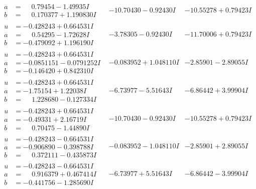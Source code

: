 \documentclass[1p]{elsarticle_modified}
\theoremstyle{definition}
\begin{document}
$$\begin{array}{c|c|c}
\begin{aligned}
a &= \phantom{-}0.79454 - 1.49935 I \\
b &= \phantom{-}0.170377 + 1.190830 I\end{aligned}
 & -10.70430 - 0.92430 I & -10.55278 + 0.79423 I \\ \hline\begin{aligned}
u &= -0.428243 + 0.664531 I \\
a &= \phantom{-}0.54295 - 1.72628 I \\
b &= -0.479092 + 1.196190 I\end{aligned}
 & -3.78305 - 0.92430 I & -11.70006 + 0.79423 I \\ \hline\begin{aligned}
u &= -0.428243 + 0.664531 I \\
a &= -0.0851151 - 0.0791252 I \\
b &= -0.146420 + 0.842310 I\end{aligned}
 & -0.083952 + 1.048110 I & -2.85901 - 2.89055 I \\ \hline\begin{aligned}
u &= -0.428243 + 0.664531 I \\
a &= -1.75154 + 1.22038 I \\
b &= \phantom{-}1.228680 - 0.127334 I\end{aligned}
 & -6.73977 - 5.51643 I & -6.86442 + 3.99904 I \\ \hline\begin{aligned}
u &= -0.428243 + 0.664531 I \\
a &= -0.49331 + 2.16719 I \\
b &= \phantom{-}0.70475 - 1.44890 I\end{aligned}
 & -10.70430 - 0.92430 I & -10.55278 + 0.79423 I \\ \hline\begin{aligned}
u &= -0.428243 - 0.664531 I \\
a &= -0.906890 - 0.398788 I \\
b &= \phantom{-}0.372111 - 0.435873 I\end{aligned}
 & -0.083952 - 1.048110 I & -2.85901 + 2.89055 I \\ \hline\begin{aligned}
u &= -0.428243 - 0.664531 I \\
a &= \phantom{-}0.916379 + 0.467414 I \\
b &= -0.441756 - 1.285690 I\end{aligned}
 & -6.73977 + 5.51643 I & -6.86442 - 3.99904 I \\ \hline\begin{aligned}

\end{aligned}
\end{array}$$
\end{document}
